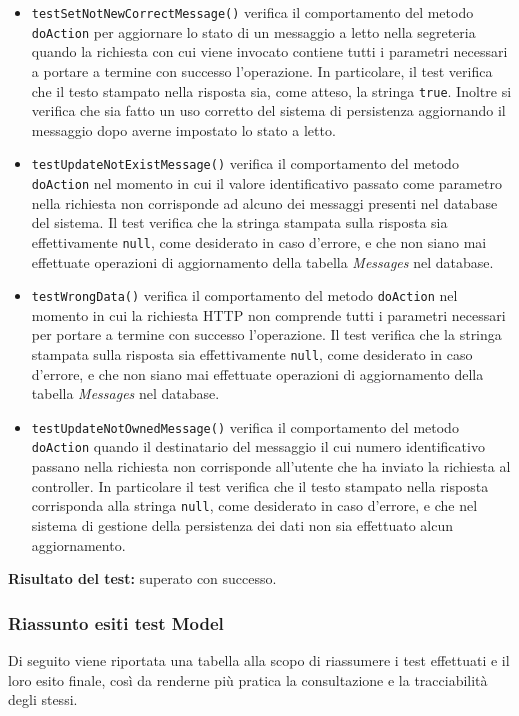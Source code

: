 \begin{itemize}
\begin{itemize}
\item \texttt{testSetNotNewCorrectMessage()} verifica il comportamento del metodo \texttt{doAction} per aggiornare lo stato di un messaggio a letto nella segreteria quando la richiesta con cui viene invocato contiene tutti i parametri necessari a portare a termine con successo l'operazione. In particolare, il test verifica che il testo stampato nella risposta sia, come atteso, la stringa \texttt{true}. Inoltre si verifica che sia fatto un uso corretto del sistema di persistenza aggiornando il messaggio dopo averne impostato lo stato a letto.

\item \texttt{testUpdateNotExistMessage()} verifica il comportamento del metodo \texttt{doAction} nel momento in cui il valore identificativo passato come parametro nella richiesta non corrisponde ad alcuno dei messaggi presenti nel database del sistema. Il test verifica che la stringa stampata sulla risposta sia effettivamente \texttt{null}, come desiderato in caso d'errore, e che non siano mai effettuate operazioni di aggiornamento della tabella \textit{Messages} nel database.

\item \texttt{testWrongData()} verifica il comportamento del metodo \texttt{doAction} nel momento in cui la richiesta HTTP non comprende tutti i parametri necessari per portare a termine con successo l'operazione. Il test verifica che la stringa stampata sulla risposta sia effettivamente \texttt{null}, come desiderato in caso d'errore, e che non siano mai effettuate operazioni di aggiornamento della tabella \textit{Messages} nel database.

\item \texttt{testUpdateNotOwnedMessage()} verifica il comportamento del metodo \texttt{doAction} quando il destinatario del messaggio il cui numero identificativo passano nella richiesta non corrisponde all'utente che ha inviato la richiesta al controller. In particolare il test verifica che il testo stampato nella risposta corrisponda alla stringa \texttt{null}, come desiderato in caso d'errore, e che nel sistema di gestione della persistenza dei dati non sia effettuato alcun aggiornamento.

\end{itemize} 
\textbf{Risultato del test:} superato con successo.

\end{itemize}

\subsubsection{Riassunto esiti test Model}
Di seguito viene riportata una tabella alla scopo di riassumere i test effettuati e il loro esito finale, così da renderne più pratica la consultazione e la tracciabilità degli stessi.

